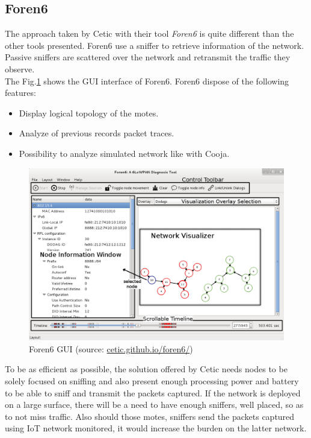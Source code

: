 \subsection{Foren6}

The approach taken by Cetic with their tool \textit{Foren6} \cite{website:foren6} is quite different than the other tools presented. Foren6 use a sniffer to retrieve information of the network. Passive sniffers are scattered over the network and retransmit the traffic they observe. \\

The Fig.\ref{fig:foren6} shows the GUI interface of Foren6. Foren6 dispose of the following features:
\begin{itemize}
  \item Display logical topology of the motes.
  \item Analyze of previous records packet traces.
  \item Possibility to analyze simulated network like with Cooja. \\
\end{itemize}

\begin{figure}
  \centering
  \includegraphics[width=\textwidth]{res/foren6.png}
  \caption{Foren6 GUI (source: \url{cetic.github.io/foren6/})}
  \label{fig:foren6}
\end{figure}

To be as efficient as possible, the solution offered by Cetic needs nodes to be solely focused on sniffing and also present enough processing power and battery to be able to sniff and transmit the packets captured. If the network is deployed on a large surface, there will be a need to have enough sniffers, well placed, so as to not miss traffic. Also should those motes, sniffers send the packets captured using IoT network monitored, it would increase the burden on the latter network.
